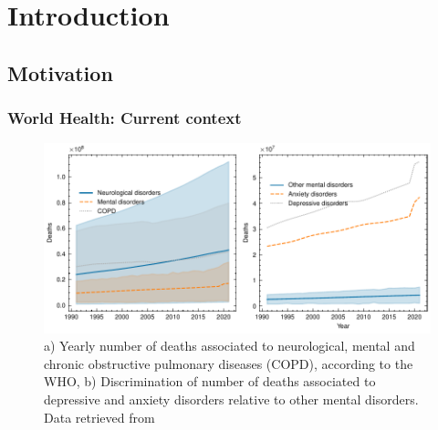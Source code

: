 
%

\chapter{Introduction}
\label{cha:introduction}











\section{Motivation}
\label{sec:motivation}

\subsection{World Health: Current context}
\label{subsec:world_health_context}

\begin{figure}[bp]
    \centering
    \includegraphics[width=1.0\textwidth]{Chapters/Figures/Introduction/deaths_neuro_mental_disorders.pdf}
    \caption{a) Yearly number of deaths associated to neurological, mental and chronic obstructive pulmonary diseases (COPD), according to the WHO, b) Discrimination of number of deaths associated to depressive and anxiety disorders relative to other mental disorders. Data retrieved from \cite{https://ghdx.healthdata.org/record/ihme-data/gbd-2021-nervous-system-disorders-1990-2021}}
    \label{fig:deaths_mental_disorders}
\end{figure}

